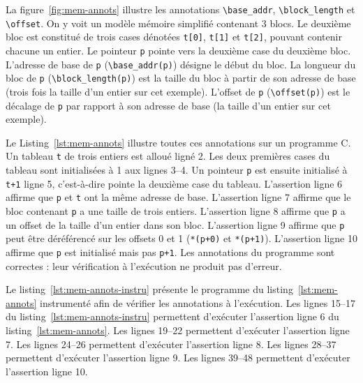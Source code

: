 


La figure~\ref{fig:mem-annots} illustre les annotations \lstinline{\base_addr},
\lstinline{\block_length} et \lstinline{\offset}.
On y voit un modèle mémoire simplifié contenant 3 blocs.
Le deuxième bloc est constitué de trois cases dénotées \lstinline't[0]',
\lstinline't[1]' et \lstinline't[2]', pouvant contenir chacune un entier.
Le pointeur \lstinline'p' pointe vers la deuxième case du deuxième bloc.
L'adresse de base de \lstinline'p' (\lstinline'\base_addr(p)') désigne le
début du bloc.
La longueur du bloc de \lstinline'p' (\lstinline'\block_length(p)') est la
taille du bloc à partir de son adresse de base (trois fois la taille d'un entier
sur cet exemple).
L'offset de \lstinline'p' (\lstinline'\offset(p)') est le décalage de
\lstinline'p' par rapport à son adresse de base (la taille d'un entier sur cet
exemple).




\begin{figure}[h!]

\end{figure}


Le Listing~\ref{lst:mem-annots} illustre toutes ces annotations sur un programme
C.
Un tableau \lstinline't' de trois entiers est alloué ligné 2.
Les deux premières cases du tableau sont initialisées à 1 aux lignes 3--4.
Un pointeur \lstinline'p' est ensuite initialisé à \lstinline't+1' ligne 5,
c'est-à-dire pointe la deuxième case du tableau.
L'assertion ligne 6 affirme que \lstinline'p' et \lstinline't' ont la même
adresse de base.
L'assertion ligne 7 affirme que le bloc contenant \lstinline'p' a une taille de
trois entiers.
L'assertion ligne 8 affirme que \lstinline'p' a un offset de la taille d'un
entier dans son bloc.
L'assertion ligne 9 affirme que \lstinline'p' peut être déréférencé sur les
offsets 0 et 1 (\lstinline'*(p+0)' et \lstinline'*(p+1)').
L'assertion ligne 10 affirme que \lstinline'p' est initialisé mais pas
\lstinline'p+1'.
Les annotations du programme sont correctes : leur vérification à l'exécution
ne produit pas d'erreur.

Le listing~\ref{lst:mem-annots-instru} présente le programme du
listing~\ref{lst:mem-annots} instrumenté afin de vérifier les annotations à
l'exécution.
Les lignes 15--17 du listing~\ref{lst:mem-annots-instru} permettent d'exécuter
l'assertion ligne 6 du listing~\ref{lst:mem-annots}.
Les lignes 19--22 permettent d'exécuter l'assertion ligne 7.
Les lignes 24--26 permettent d'exécuter l'assertion ligne 8.
Les lignes 28--37 permettent d'exécuter l'assertion ligne 9.
Les lignes 39--48 permettent d'exécuter l'assertion ligne 10.


